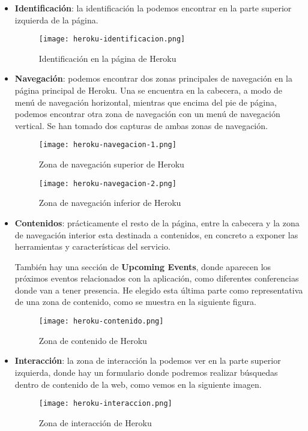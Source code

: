 \begin{itemize}
    \item \textbf{Identificación}: la identificación la podemos encontrar en la parte superior izquierda de la página.

    \begin{figure}[H]
        \centering
        \texttt{[image: heroku-identificacion.png]}
        \caption{Identificación en la página de Heroku}
    \end{figure}

    \item \textbf{Navegación}: podemos encontrar dos zonas principales de navegación en la página principal de Heroku. Una se encuentra en la cabecera, a modo de menú de navegación horizontal, mientras que encima del pie de página, podemos encontrar otra zona de navegación con un menú de navegación vertical. Se han tomado dos capturas de ambas zonas de navegación.

    \begin{figure}[H]
        \centering
        \texttt{[image: heroku-navegacion-1.png]}
        \caption{Zona de navegación superior de Heroku}
    \end{figure}

    \begin{figure}[H]
        \centering
        \texttt{[image: heroku-navegacion-2.png]}
        \caption{Zona de navegación inferior de Heroku}
    \end{figure}

    \item \textbf{Contenidos}: prácticamente el resto de la página, entre la cabecera y la zona de navegación interior esta destinada a contenidos, en concreto a exponer las herramientas y características del servicio.

    También hay una sección de \textbf{Upcoming Events}, donde aparecen los próximos eventos relacionados con la aplicación, como diferentes conferencias donde van a tener presencia. He elegido esta última parte como representativa de una zona de contenido, como se muestra en la siguiente figura.

    \begin{figure}[H]
        \centering
        \texttt{[image: heroku-contenido.png]}
        \caption{Zona de contenido de Heroku}
    \end{figure}

    \item \textbf{Interacción}: la zona de interacción la podemos ver en la parte superior izquierda, donde hay un formulario donde podremos realizar búsquedas dentro de contenido de la web, como vemos en la siguiente imagen.

    \begin{figure}[H]
        \centering
        \texttt{[image: heroku-interaccion.png]}
        \caption{Zona de interacción de Heroku}
    \end{figure}
\end{itemize}

